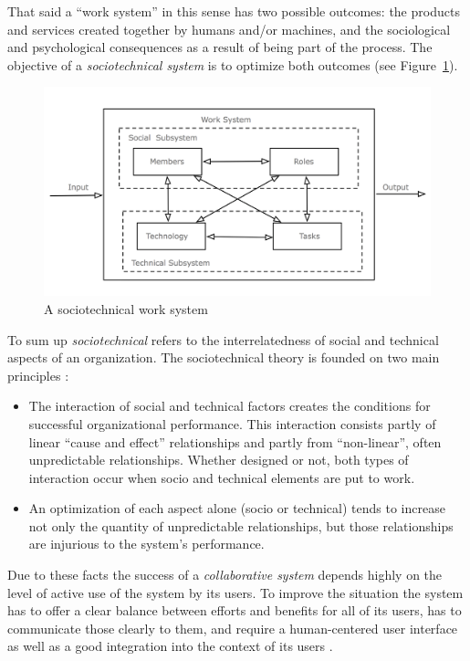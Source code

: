 That said a ``work system'' in this sense has two possible outcomes: the products and services created together by humans and/or machines, and the sociological and psychological consequences as a result of being part of the process. The objective of a \emph{sociotechnical system} is to optimize both outcomes (see Figure~\ref{fig:images_sociotechnical_system}). \@

\begin{figure}[H]
  \centering
  \includegraphics[width=0.9\columnwidth]{images/sociotechnical_system.png}
  \caption[A sociotechnical work system]{A sociotechnical work system \citep{xx}}
\label{fig:images_sociotechnical_system}
\end{figure}

To sum up \emph{sociotechnical} refers to the interrelatedness of social and technical aspects of an organization. The sociotechnical theory is founded on two main principles \citep{Koch2008}: \@

\begin{itemize}
  \item The interaction of social and technical factors creates the conditions for successful organizational performance. This interaction consists partly of linear ``cause and effect'' relationships and partly from ``non-linear'', often unpredictable relationships. Whether designed or not, both types of interaction occur when socio and technical elements are put to work.
  \item An optimization of each aspect alone (socio or technical) tends to increase not only the quantity of unpredictable relationships, but those relationships are injurious to the system's performance.
\end{itemize}

Due to these facts the success of a \emph{collaborative system} depends highly on the level of active use of the system by its users. To improve the situation the system has to offer a clear balance between efforts and benefits for all of its users, has to communicate those clearly to them, and require a human-centered user interface as well as a good integration into the context of its users \citep{Koch2008}.

